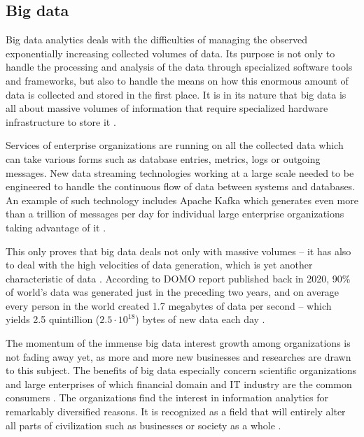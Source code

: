 \documentclass[a4paper,twoside,12pt]{book}
\begin{document}
\subsection{Big data}

Big data analytics deals with the difficulties of managing the observed exponentially increasing collected volumes of data. Its purpose is not only to handle the processing and analysis of the data through specialized software tools and frameworks, but also to handle the means on how this enormous amount of data is collected and stored in the first place. It is in its nature that big data is all about massive volumes of information that require specialized hardware infrastructure to store it \cite{bib:big_data_analytics}.

Services of enterprise organizations are running on all the collected data which can take various forms such as database entries, metrics, logs or outgoing messages. New data streaming technologies working at a large scale needed to be engineered to handle the continuous flow of data between systems and databases. An example of such technology includes Apache Kafka which generates even more than a trillion of messages per day for individual large enterprise organizations taking advantage of it \cite{bib:kafka_online}\cite{bib:kafka}.

This only proves that big data deals not only with massive volumes – it has also to deal with the high velocities of data generation, which is yet another characteristic of data \cite{bib:big_data_analytics}. According to DOMO report published back in 2020, 90\% of world's data was generated just in the preceding two years, and on average every person in the world created 1.7 megabytes of data per second – which yields 2.5 quintillion ($2.5 \cdot 10^{18}$) bytes of new data each day \cite{bib:domo}.



The momentum of the immense big data interest growth among organizations is not fading away yet, as more and more new businesses and researches are drawn to this subject. The benefits of big data especially concern scientific organizations and large enterprises of which financial domain and IT industry are the common consumers \cite{bib:anonymization_chaos}. The organizations find the interest in information analytics for remarkably diversified reasons. It is recognized as a field that will entirely alter all parts of civilization such as businesses or society as a whole \cite{bib:big_data_in_practice}.
\end{document}
